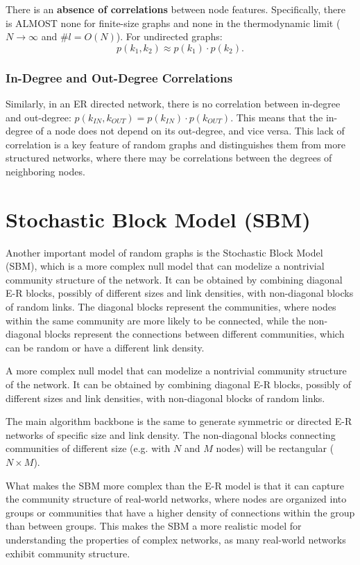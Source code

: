 There is an \textbf{absence of correlations} between node features. Specifically, there is ALMOST none for finite-size graphs and none in the thermodynamic limit (\(N \to \infty\) and \(\# l = O(N)\)). For undirected graphs:
\[
    p(k_1, k_2) \approx p(k_1) \cdot p(k_2).
\]

\subsubsection{In-Degree and Out-Degree Correlations}
Similarly, in an ER directed network, there is no correlation between in-degree and out-degree: $p(k_{IN}, k_{OUT}) = p(k_{IN}) \cdot p(k_{OUT})$. This means that the in-degree of a node does not depend on its out-degree, and vice versa. This lack of correlation is a key feature of random graphs and distinguishes them from more structured networks, where there may be correlations between the degrees of neighboring nodes.

\section{Stochastic Block Model (SBM)}

Another important model of random graphs is the Stochastic Block Model (SBM), which is a more complex null model that can modelize a nontrivial community structure of the network. It can be obtained by combining diagonal E-R blocks, possibly of different sizes and link densities, with non-diagonal blocks of random links. The diagonal blocks represent the communities, where nodes within the same community are more likely to be connected, while the non-diagonal blocks represent the connections between different communities, which can be random or have a different link density.

\begin{definition}
    A more complex null model that can modelize a nontrivial community structure of the network. It can be obtained by combining diagonal E-R blocks, possibly of different sizes and link densities, with non-diagonal blocks of random links.
\end{definition}
The main algorithm backbone is the same to generate symmetric or directed E-R networks of specific size and link density. The non-diagonal blocks connecting communities of different size (e.g. with \(N\) and \(M\) nodes) will be rectangular (\(N \times M\)).

What makes the SBM more complex than the E-R model is that it can capture the community structure of real-world networks, where nodes are organized into groups or communities that have a higher density of connections within the group than between groups. This makes the SBM a more realistic model for understanding the properties of complex networks, as many real-world networks exhibit community structure.

